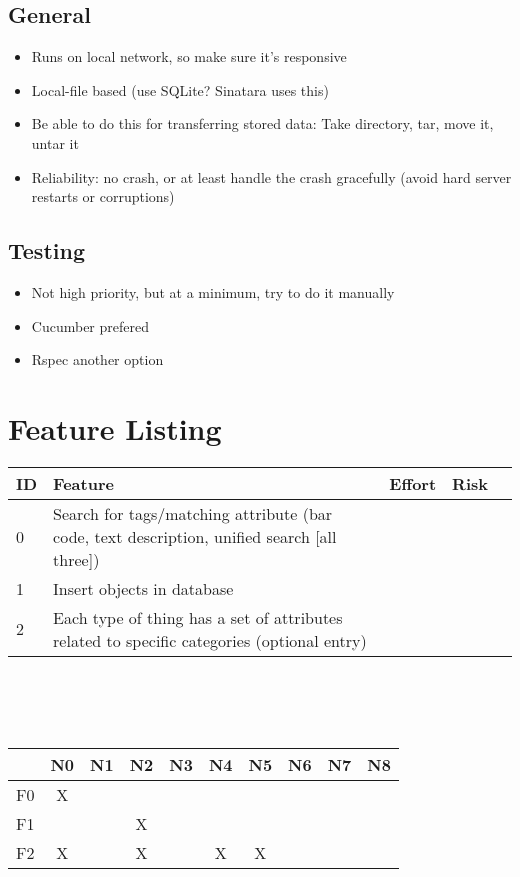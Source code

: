 \documentclass{article}
\begin{document}
\subsection{General}
\begin{itemize}
\item Runs on local network, so make sure it's responsive
\item Local-file based (use SQLite? Sinatara uses this)
\item Be able to do this for transferring stored data: Take directory, tar, move it, untar it
\item Reliability: no crash, or at least handle the crash gracefully (avoid hard server restarts or corruptions)
\end{itemize}

\subsection{Testing}
\begin{itemize}
\item Not high priority, but at a minimum, try to do it manually
\item Cucumber prefered
\item Rspec another option
\end{itemize}

\section{Feature Listing}
\begin{tabular}{ | p{0.25in} | p{3.25in} | p{0.5in} | p{0.5in} | p{0.5in} | }
\hline
\textbf{ID} & \textbf{Feature} & \textbf{Effort} & \textbf{Risk}\\
\hline
\hline
0 & Search for tags/matching attribute (bar code, text description, unified search [all three]) &  & \\
\hline
1 & Insert objects in database &  & \\
\hline
2 & Each type of thing has a set of attributes related to specific categories (optional entry) &  & \\
\hline
\end{tabular}\\
~\\
~\\
\begin{tabular}{ | c || c | c | c | c | c | c | c| c | c | }
\hline
   & N0 & N1 & N2 & N3 & N4 & N5 & N6 & N7 & N8\\
\hline
\hline
F0 & X  &    &    &    &    &    &    &    &   \\
\hline
F1 &    &    & X  &    &    &    &    &    &   \\
\hline
F2 & X  &    & X  &    & X  & X  &    &    &   \\
\hline
\end{tabular}
\end{document}
